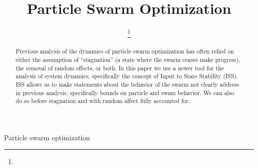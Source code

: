 \documentclass[journal]{IEEEtran}
\begin{document}
\title{Particle Swarm Optimization}

\author{

\thanks{}
}

\markboth{}{}

\maketitle

\begin{abstract}
Previous analysis of the dynamics of particle swarm optimization has often relied on either the assumption of ``stagnation'' (a state where the swarm ceases make progress), the removal of random effects, or both.
In this paper we use a newer tool for the analysis of system dynamics, specifically the concept of Input to State Stability (ISS).
ISS allows us to make statements about the behavior of the swarm not clearly address in previous analysis, specifically bounds on particle and swam behavior.
We can also do so before stagnation and with random affect fully accounted for. 
\end{abstract}

\begin{IEEEkeywords}
Particle swarm optimization
\end{IEEEkeywords}

\IEEEpeerreviewmaketitle















\end{document}
